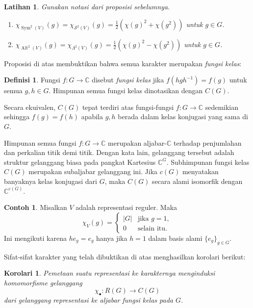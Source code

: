 \documentclass[12pt]{article}
\theoremstyle{plain}
\newtheorem{corollary}[theorem]{Korolari}
\newtheorem{exercise}[theorem]{Latihan}
\theoremstyle{definition}
\newtheorem{definition}[theorem]{Definisi}
\newtheorem{example}[theorem]{Contoh}
\theoremstyle{remark}
\numberwithin{equation}{section}
\begin{document}
\begin{exercise}
Gunakan notasi dari proposisi sebelumnya.
\begin{enumerate}
\item $\displaystyle
\chi_{\operatorname{Sym}^2(V)}(g)=
\chi_{\mathcal{S}^2(V)}(g)
=  \frac{1}{2}\left(\chi(g)^2 + \chi(g^2)\right)$ untuk $g \in G$.
\item $\displaystyle
\chi_{\operatorname{Alt}^2(V)}(g)=
\chi_{\Lambda^2(V)}(g)
=  \frac{1}{2}\left(\chi(g)^2 - \chi(g^2)\right)$ untuk $g \in G$.
\end{enumerate}
\end{exercise}

Proposisi di atas membuktikan bahwa semua karakter merupakan \emph{fungsi
kelas}:

\begin{definition}
Fungsi $f : G \to \mathbb{C}$ disebut \emph{fungsi kelas}
jika $f(hgh^{-1})=f(g)$ untuk semua $g,h \in G$.
Himpunan semua fungsi kelas dinotasikan dengan $C(G)$.
\end{definition}

Secara ekuivalen, $C(G)$ tepat terdiri atas fungsi-fungsi $f : G \to
\mathbb{C}$ sedemikian sehingga $f(g)=f(h)$ apabila $g, h$ berada dalam
kelas konjugasi yang sama di $G$.

Himpunan semua fungsi $f : G \to \mathbb{C}$ merupakan
aljabar-$\mathbb{C}$ terhadap penjumlahan dan perkalian titik demi titik.
Dengan kata lain, gelanggang tersebut adalah struktur gelanggang biasa pada
pangkat Kartesius $\mathbb{C}^G$.
Subhimpunan fungsi kelas $C(G)$ merupakan subaljabar gelanggang ini.
Jika $c(G)$ menyatakan banyaknya kelas konjugasi dari $G$,
maka $C(G)$ secara alami isomorfik dengan $\mathbb{C}^{c(G)}$.

\begin{example} \label{eg:regular_rep}
Misalkan $V$ adalah representasi reguler. Maka
\[
\chi_V(g) = \begin{cases}
|G| & \textrm{jika $g=1$},\\
0 & \textrm{selain itu}.
\end{cases}
\]
Ini mengikuti karena $he_g=e_g$ hanya jika $h = 1$ dalam basis alami $\{e_g\}_{g \in G}$.
\end{example}

Sifat-sifat karakter yang telah dibuktikan di atas menghasilkan
korolari berikut:

\begin{corollary}
Pemetaan suatu representasi ke karakternya
menginduksi homomorfisme gelanggang
\[
\chi_{\bullet}: R(G) \to C(G)
\]
dari gelanggang representasi ke aljabar fungsi kelas pada $G$.
\end{corollary}
\end{document}
